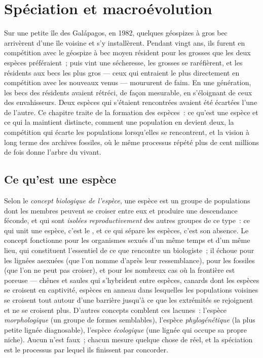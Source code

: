 \chapter{Spéciation et macroévolution}\label{ch:b2:speciation}

Sur une petite île des Galápagos, en 1982, quelques géospizes à gros bec
arrivèrent d'une île voisine et s'y installèrent. Pendant vingt ans, ils
furent en compétition avec le géospize à bec moyen résident pour les
grosses  que les deux espèces préféraient~; puis vint une
sécheresse, les grosses  se raréfièrent, et les résidents aux becs
les plus gros --- ceux qui entraient le plus directement en compétition
avec les nouveaux venus --- moururent de faim. En une génération, les becs
des résidents avaient rétréci, de façon mesurable, en s'éloignant de ceux
des envahisseurs. Deux espèces qui s'étaient rencontrées avaient été
écartées l'une de l'autre. Ce chapitre traite de la formation des
espèces~: ce qu'est une espèce et ce qui la maintient distincte, comment
une population en devient deux, la compétition qui écarte les populations
lorsqu'elles se rencontrent, et la vision à long terme des archives
fossiles, où le même processus répété plus de cent millions de fois
donne l'arbre du vivant.

\section{Ce qu'est une espèce}

\begin{definition}[Espèce]\label{def:b2:speciation:species}
Selon le \emph{concept biologique de l'espèce}, une espèce est un groupe
de populations dont les membres peuvent se croiser entre eux et
produire une descendance féconde, et qui sont \emph{isolées
reproductivement} des autres groupes de ce type~: ce qui unit une espèce,
c'est le , et ce qui sépare les espèces, c'est son absence.
Le concept fonctionne pour les organismes sexués d'un même temps et d'un
même lieu, qui constituent l'essentiel de ce que rencontre un
biologiste~; il échoue pour les lignées asexuées (que l'on nomme d'après
leur ressemblance), pour les fossiles (que l'on ne peut pas croiser), et
pour les nombreux cas où la frontière est poreuse --- chênes et saules
qui s'hybrident entre espèces, canards dont les espèces se croisent en
captivité, espèces en anneau dans lesquelles les populations voisines se
croisent tout autour d'une barrière jusqu'à ce que les extrémités se
rejoignent et ne se croisent plus. D'autres concepts comblent ces lacunes~:
l'espèce \emph{morphologique} (un groupe de formes semblables), l'espèce
\emph{phylogénétique} (la plus petite lignée diagnosable), l'espèce
\emph{écologique} (une lignée qui occupe sa propre niche). Aucun n'est
faux~; chacun mesure quelque chose de réel, et la spéciation est le
processus par lequel ils finissent par concorder.
\end{definition}

